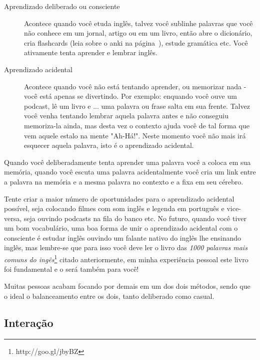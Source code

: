 \begin{description}

	\item[Aprendizado deliberado ou consciente] Acontece quando você
		etuda inglês, talvez você sublinhe palavras que você não
		conhece em um jornal, artigo ou em um livro, então abre o
		dicionário, cria flashcards (leia sobre o anki na
		página~\pageref{sub:programas_para_memoria_o}), estude
		gramática etc. Você ativamente tenta aprender e lembrar
		inglês.

	\item[Aprendizado acidental] Acontece quando você não está
		tentando aprender, ou memorizar nada - você está apenas se
		divertindo. Por exemplo: enquando você ouve um podcast, lê um
		livro e ... uma palavra ou frase salta em sua frente. Talvez
		você venha tentando lembrar aquela palavra antes e não
		conseguiu memoriza-la ainda, mas desta vez o contexto ajuda
		você de tal forma que vem aquele estalo na mente "Ah-Há!".
		Neste momento você não mais irá esquecer aquela palavra, isto
		é o aprendizado acidental.

\end{description}

Quando você deliberadamente tenta aprender uma palavra você a coloca
em sua memória, quando você escuta uma palavra acidentalmente você cria
um link entre a palavra na memória e a mesma palavra no contexto e a
fixa em seu cérebro.

Tente criar a maior número de oportunidades para o aprendizado
acidental possível, seja colocando filmes com som inglês e legenda em
português e vice-versa, seja ouvindo podcasts na fila do banco etc. No
futuro, quando você tiver um bom vocabulário, uma boa forma de unir o
aprendizado acidental com o consciente é estudar inglês ouvindo um
falante nativo do inglês lhe ensinando inglês, mas lembre-se que para
isso você deve ler o livro das \emph{1000 palavras mais comuns do
ingês}\footnote{http://goo.gl/jbyBZ} citado anteriormente, em minha
experiência pessoal este livro foi fundamental e o será também para
você!

\vspace{0.3\baselineskip}
\noindent
{\footnotesize {} Muitas pessoas acabam focando por demais em um dos dois métodos,
sendo que o ideal o balanceamento entre os dois, tanto deliberado como
casual}.



\newpage
\subsection{Interação}\label{sub:interacao}

